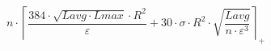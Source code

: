 \[n \cdot \left\lceil \frac{384 \cdot \sqrt{Lavg \cdot Lmax} \cdot R^{2}}{\varepsilon} + 30 \cdot \sigma \cdot R^{2} \cdot \sqrt{\frac{Lavg}{n \cdot \varepsilon^{3}}} \right\rceil_{+}\]
